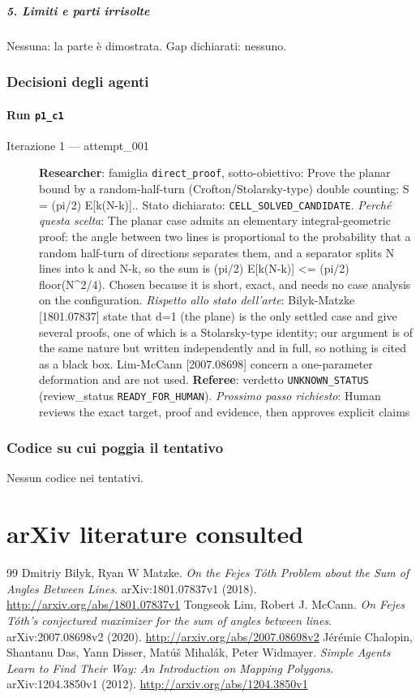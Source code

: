 \documentclass[11pt,a4paper]{article}
\begin{document}
\subparagraph{5. Limiti e parti
irrisolte}\label{limiti-e-parti-irrisolte}

Nessuna: la parte è dimostrata. Gap dichiarati: nessuno.

\subsubsection{Decisioni degli agenti}
\paragraph{Run \texttt{p1\_c1}}
\begin{description}
\item[Iterazione 1 — attempt\_001]
\textbf{Researcher}: famiglia \texttt{direct\_proof}, sotto-obiettivo: Prove the planar bound by a random-half-turn (Crofton/Stolarsky-type) double counting: S = (pi/2) E[k(N-k)].. Stato dichiarato: \texttt{CELL\_SOLVED\_CANDIDATE}.
\emph{Perché questa scelta}: The planar case admits an elementary integral-geometric proof: the angle between two lines is proportional to the probability that a random half-turn of directions separates them, and a separator splits N lines into k and N-k, so the sum is (pi/2) E[k(N-k)] \textless{}= (pi/2) floor(N\textasciicircum{}2/4). Chosen because it is short, exact, and needs no case analysis on the configuration.
\emph{Rispetto allo stato dell'arte}: Bilyk-Matzke [1801.07837] state that d=1 (the plane) is the only settled case and give several proofs, one of which is a Stolarsky-type identity; our argument is of the same nature but written independently and in full, so nothing is cited as a black box. Lim-McCann [2007.08698] concern a one-parameter deformation and are not used.
\textbf{Referee}: verdetto \texttt{UNKNOWN\_STATUS} (review\_status \texttt{READY\_FOR\_HUMAN}).
\emph{Prossimo passo richiesto}: Human reviews the exact target, proof and evidence, then approves explicit claims
\end{description}

\subsubsection{Codice su cui poggia il tentativo}
Nessun codice nei tentativi.

\section{arXiv literature consulted}
\begin{thebibliography}{99}
 Dmitriy Bilyk, Ryan W Matzke. \emph{On the Fejes Tóth Problem about the Sum of Angles Between Lines}. arXiv:1801.07837v1 (2018). \url{http://arxiv.org/abs/1801.07837v1}
 Tongseok Lim, Robert J. McCann. \emph{On Fejes Tóth's conjectured maximizer for the sum of angles between lines}. arXiv:2007.08698v2 (2020). \url{http://arxiv.org/abs/2007.08698v2}
 Jérémie Chalopin, Shantanu Das, Yann Disser, Matúš Mihalák, Peter Widmayer. \emph{Simple Agents Learn to Find Their Way: An Introduction on Mapping Polygons}. arXiv:1204.3850v1 (2012). \url{http://arxiv.org/abs/1204.3850v1}
\end{thebibliography}
\end{document}

